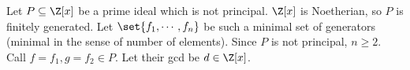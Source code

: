\begin{sol}
Let $P\subseteq \Z[x]$ be a prime ideal which is not principal. $\Z[x]$ is Noetherian, so $P$ is finitely generated. Let $\set{f_1,\cdots,f_n}$ be such a minimal set of generators (minimal in the sense of number of elements). Since $P$ is not principal, $n\geq 2$. Call $f=f_1,g=f_2 \in P$. Let their gcd be $d\in\Z[x]$.
\end{sol}